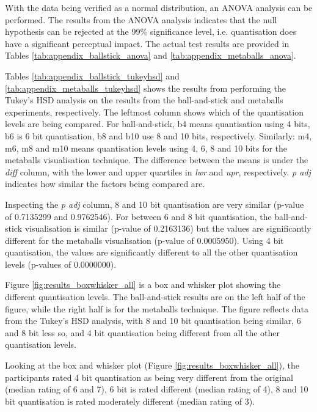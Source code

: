With the data being verified as a normal distribution, an ANOVA analysis can be
performed. The results from the ANOVA analysis indicates that the null
hypothesis can be rejected at the 99\% significance level, i.e.  quantisation
does have a significant perceptual impact. The actual test results are provided
in Tables \ref{tab:appendix_ballstick_anova} and
\ref{tab:appendix_metaballs_anova}.

Tables \ref{tab:appendix_ballstick_tukeyhsd} and
\ref{tab:appendix_metaballs_tukeyhsd} shows the results from performing the
Tukey's HSD analysis on the results from the ball-and-stick and metaballs
experiments, respectively. The leftmost column shows which of the quantisation
levels are being compared. For ball-and-stick, b4 means quantisation using 4
bits, b6 is 6 bit quantisation, b8 and b10 use 8 and 10 bits, respectively.
Similarly: m4, m6, m8 and m10 means quantisation levels using 4, 6, 8 and 10
bits for the metaballs visualisation technique. The difference between the
means is under the \emph{diff} column, with the lower and upper quartiles in
\emph{lwr} and \emph{upr}, respectively. \emph{p adj} indicates how similar the
factors being compared are.

Inspecting the \emph{p adj} column, 8 and 10 bit quantisation are very similar
(p-value of 0.7135299 and 0.9762546). For between 6 and 8 bit quantisation, the
ball-and-stick visualisation is similar (p-value of 0.2163136) but the values
are significantly different for the metaballs visualisation (p-value of
0.0005950). Using 4 bit quantisation, the values are significantly different to
all the other quantisation levels (p-values of 0.0000000).

Figure \ref{fig:results_boxwhisker_all} is a box and whisker plot showing the
different quantisation levels. The ball-and-stick results are on the left half
of the figure, while the right half is for the metaballs technique. The figure
reflects data from the Tukey's HSD analysis, with 8 and 10 bit quantisation
being similar, 6 and 8 bit less so, and 4 bit quantisation being different from
all the other quantisation levels.

Looking at the box and whisker plot (Figure \ref{fig:results_boxwhisker_all}),
the participants rated 4 bit quantisation as being very different from the
original (median rating of 6 and 7), 6 bit is rated different (median rating of
4), 8 and 10 bit quantisation is rated moderately different (median rating of
3).


